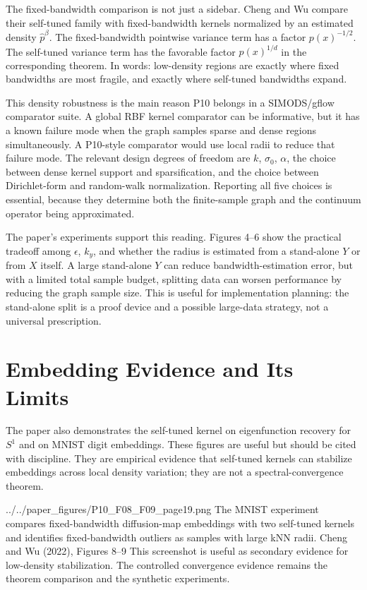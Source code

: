 \documentclass[11pt]{article}
\begin{document}
The fixed-bandwidth comparison is not just a sidebar. Cheng and Wu compare
their self-tuned family with fixed-bandwidth kernels normalized by an estimated
density \(\widehat p^\beta\). The fixed-bandwidth pointwise variance term has
a factor \(p(x)^{-1/2}\). The self-tuned variance term has the favorable
factor \(p(x)^{1/d}\) in the corresponding theorem. In words: low-density
regions are exactly where fixed bandwidths are most fragile, and exactly
where self-tuned bandwidths expand.

This density robustness is the main reason P10 belongs in a SIMODS/gflow
comparator suite. A global RBF kernel comparator can be informative, but it
has a known failure mode when the graph samples sparse and dense regions
simultaneously. A P10-style comparator would use local radii to reduce that
failure mode. The relevant design degrees of freedom are \(k\), \(\sigma_0\),
\(\alpha\), the choice between dense kernel support and sparsification, and
the choice between Dirichlet-form and random-walk normalization. Reporting all
five choices is essential, because they determine both the finite-sample graph
and the continuum operator being approximated.

The paper's experiments support this reading. Figures 4--6 show the practical
tradeoff among \(\epsilon\), \(k_y\), and whether the radius is estimated from
a stand-alone \(Y\) or from \(X\) itself. A large stand-alone \(Y\) can reduce
bandwidth-estimation error, but with a limited total sample budget, splitting
data can worsen performance by reducing the graph sample size. This is useful
for implementation planning: the stand-alone split is a proof device and a
possible large-data strategy, not a universal prescription.

\section{Embedding Evidence and Its Limits}

The paper also demonstrates the self-tuned kernel on eigenfunction recovery
for \(S^1\) and on MNIST digit embeddings. These figures are useful but should
be cited with discipline. They are empirical evidence that self-tuned kernels
can stabilize embeddings across local density variation; they are not a
spectral-convergence theorem.

\paperfigure
  {../../paper_figures/P10_F08_F09_page19.png}
  {The MNIST experiment compares fixed-bandwidth diffusion-map embeddings with
  two self-tuned kernels and identifies fixed-bandwidth outliers as samples
  with large kNN radii.}
  {Cheng and Wu (2022), Figures 8--9}
  {This screenshot is useful as secondary evidence for low-density
  stabilization. The controlled convergence evidence remains the theorem
  comparison and the synthetic experiments.}
\end{document}
